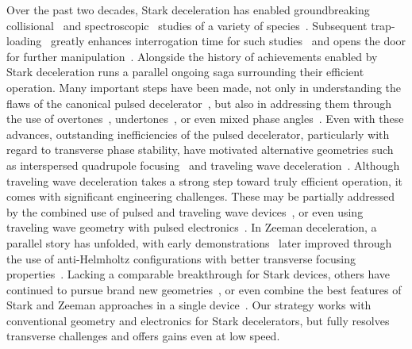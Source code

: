 \documentclass[%
 reprint,
 amsmath,amssymb,
 aps,
prl,
]{revtex4-1}
\begin{document}
\maketitle


Over the past two decades, Stark deceleration has enabled groundbreaking collisional~\cite{Sawyer2011,Kirste2012,Gao2018} and spectroscopic~\cite{Veldhoven2004,Hudson2006,Lev2006,Fast2018} studies of a variety of species~\cite{VanDeMeerakker2012}. 
Subsequent trap-loading~\cite{Bethlem2002,Sawyer2007} greatly enhances interrogation time for such studies~\cite{Sawyer2008} and opens the door for further manipulation~\cite{Reens2017}. 
Alongside the history of achievements enabled by Stark deceleration runs a parallel ongoing saga surrounding their efficient operation. 
Many important steps have been made, not only in understanding the flaws of the canonical pulsed decelerator~\cite{VanDeMeerakker2006,Sawyer2008a}, but also in addressing them through the use of overtones~\cite{VanDeMeerakker2005a,Scharfenberg2009}, undertones~\cite{Zhang2016}, or even mixed phase angles~\cite{Parazzoli2009,Hou2013}. 
Even with these advances, outstanding inefficiencies of the pulsed decelerator, particularly with regard to transverse phase stability, have motivated alternative geometries such as interspersed quadrupole focusing~\cite{Sawyer2008a} and traveling wave deceleration~\cite{Osterwalder2010,VandenBerg2014,Fabrikant2014}.
Although traveling wave deceleration takes a strong step toward truly efficient operation, it comes with significant engineering challenges. 
These may be partially addressed by the combined use of pulsed and traveling wave devices~\cite{Quintero-Perez2013}, or even using traveling wave geometry with pulsed electronics~\cite{Hou2016,Shyur2017}. 
In Zeeman deceleration, a parallel story has unfolded, with early demonstrations~\cite{Vanhaecke2007,Narevicius2008} later improved through the use of anti-Helmholtz configurations with better transverse focusing properties~\cite{LavertOfir2011,Dulitz2014}.
Lacking a comparable breakthrough for Stark devices, others have continued to pursue brand new geometries~\cite{Wang2016}, or even combine the best features of Stark and Zeeman approaches in a single device~\cite{Cremers2017,Plomp2019}.
Our strategy works with conventional geometry and electronics for Stark decelerators, but fully resolves transverse challenges and offers gains even at low speed.
\end{document}
